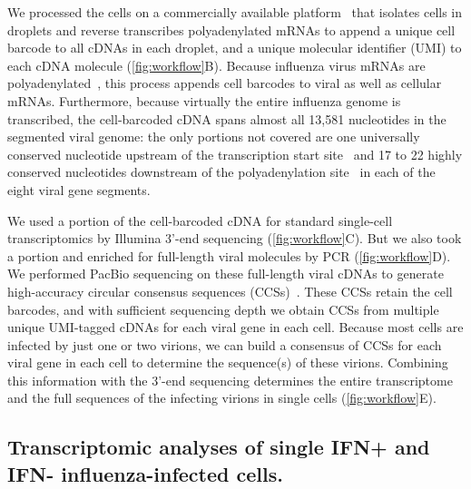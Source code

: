 \documentclass[lineno]{asm-article}
\newcommand{\FIG}[1]{\autoref{fig:#1}}
\begin{document}
We processed the cells on a commercially available platform~\cite{zheng2017massively} that isolates cells in droplets and reverse transcribes polyadenylated mRNAs to append a unique cell barcode to all cDNAs in each droplet, and a unique molecular identifier (UMI) to each cDNA molecule (\FIG{workflow}B).
Because influenza virus mRNAs are polyadenylated~\cite{robertson1981polyadenylation}, this process appends cell barcodes to viral as well as cellular mRNAs.
Furthermore, because virtually the entire influenza genome is transcribed, the cell-barcoded cDNA spans almost all 13,581 nucleotides in the segmented viral genome: the only portions not covered are one universally conserved nucleotide upstream of the transcription start site~\cite{koppstein2015sequencing} and 17 to 22 highly conserved nucleotides downstream of the polyadenylation site~\cite{robertson1981polyadenylation} in each of the eight viral gene segments.

We used a portion of the cell-barcoded cDNA for standard single-cell transcriptomics by Illumina 3'-end sequencing (\FIG{workflow}C).
But we also took a portion and enriched for full-length viral molecules by PCR (\FIG{workflow}D).
We performed PacBio sequencing on these full-length viral cDNAs to generate high-accuracy circular consensus sequences (CCSs)~\cite{travers2010flexible}.
These CCSs retain the cell barcodes, and with sufficient sequencing depth we obtain CCSs from multiple unique UMI-tagged cDNAs for each viral gene in each cell.
Because most cells are infected by just one or two virions, we can build a consensus of CCSs for each viral gene in each cell to determine the sequence(s) of these virions.
Combining this information with the 3'-end sequencing determines the entire transcriptome and the full sequences of the infecting virions in single cells (\FIG{workflow}E).

\subsection{Transcriptomic analyses of single IFN+ and IFN- influenza-infected cells.}
\end{document}
